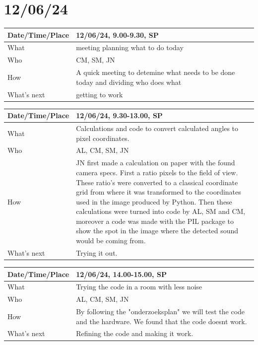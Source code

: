 \documentclass{article}
\begin{document}
\section{12/06/24}

\begin{table}[H]
\begin{tabular}{|p{1.5in}|p{4in}|}
\hline
Date/Time/Place & 12/06/24, 9.00-9.30, SP \\ \hline
What            & meeting planning what to do today \\ \hline
Who             & CM, SM, JN \\ \hline
How             & A quick meeting to detemine what needs to be done today and dividing who does what \\ \hline
What's next     &  getting to work\\ \hline
\end{tabular}
\end{table}

\begin{table}[H]
\begin{tabular}{|p{1.5in}|p{4in}|}
\hline
Date/Time/Place & 12/06/24, 9.30-13.00, SP \\ \hline
What            & Calculations and code to convert calculated angles to pixel coordinates. \\ \hline
Who             & AL, CM, SM, JN \\ \hline
How             & JN first made a calculation on paper with the found camera specs. First a ratio pixels to the field of view. These ratio's were converted to a classical coordinate grid from where it was transformed to the coordinates used in the image produced by Python. Then these calculations were turned into code by AL, SM and CM, moreover a code was made with the PIL package to show the spot in the image where the detected sound would be coming from.\\ \hline
What's next     & Trying it out. \\ \hline
\end{tabular}
\end{table}

\begin{table}[H]
\begin{tabular}{|p{1.5in}|p{4in}|}
\hline
Date/Time/Place &  12/06/24, 14.00-15.00, SP\\ \hline
What            & Trying the code in a room with less noise \\ \hline
Who             &  AL, CM, SM, JN\\ \hline
How             & By following the "onderzoeksplan" we will test the code and the hardware. We found that the code doesnt work. \\ \hline
What's next     & Refining the code and making it work. \\ \hline
\end{tabular}
\end{table}
\end{document}
